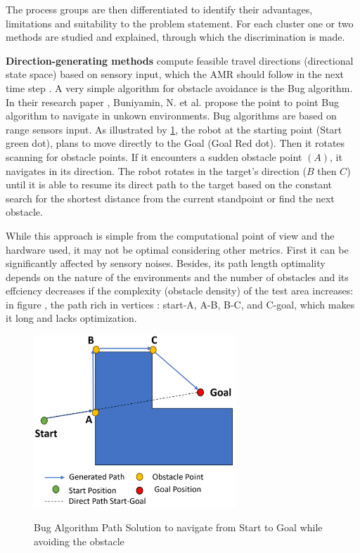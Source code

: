 The process groups are then differentiated to identify their advantages, limitations and suitability 
to the problem statement. For each cluster one or two methods are studied and explained, through which 
the discrimination is made. 

\textbf{Direction-generating methods} compute feasible travel directions (directional state space) 
based on sensory input, which the AMR should follow in the next time step \cite{R28}.
A very simple algorithm for obstacle avoidance is the Bug algorithm.
In their research paper \cite{R25},
Buniyamin, N. et al. propose the point to point Bug algorithm to navigate in unkown environments. 
Bug algorithms are based on range sensors input. As illustrated by \ref{Bug_Algo}, the robot at the 
starting point (Start green dot), 
plans to move directly to the 
Goal (Goal Red dot). Then it rotates scanning for obstacle points. 
If it encounters a sudden obstacle point \((A)\), it navigates in its direction.
The robot rotates in the target's direction (\(B\) then \(C\)) until it is able to resume its direct path to 
the target based on the 
constant search for the shortest distance from the current standpoint or find the next obstacle. 

While this approach is simple from the computational point of view and the hardware used, it may not be 
optimal considering other metrics. First it can be significantly affected by sensory noises.
Besides, its path length optimality depends on the nature of the environments and the number of obstacles 
and its effciency decreases if the complexity (obstacle density) of the test area increases: in figure 
, the path rich in vertices : start-A, A-B, B-C, and C-goal, which makes it 
long and lacks optimization.

\begin{figure}[H]
    \begin{center}
        \includegraphics[width=3in]{images/Chap1/Bug_Algo.png}\\
        \caption{Bug Algorithm Path Solution to navigate from Start to Goal while avoiding
        the obstacle}
        \label{Bug_Algo}
        \end{center}
\end{figure}

